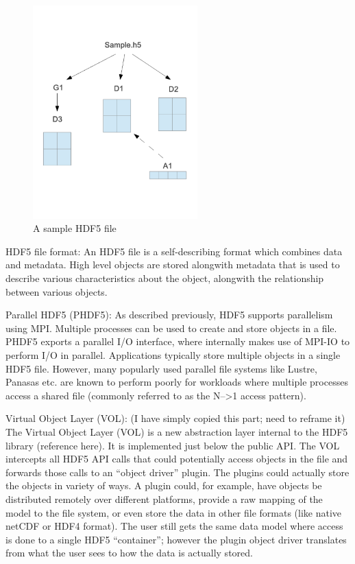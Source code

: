 \begin{figure}[!t]
\centering
\includegraphics[width=2.5in]{hdf5_example}
\caption{A sample HDF5 file}
\label{hdf5_example}
\end{figure}

HDF5 file format:
An HDF5 file is a self-describing format which combines data and metadata. High level objects are stored alongwith metadata that is used to describe various characteristics about the object, alongwith the relationship between various objects.  

Parallel HDF5 (PHDF5):
As described previously, HDF5 supports parallelism using MPI. Multiple processes can be used to create and store objects in a file. PHDF5 exports a parallel I/O interface, where internally makes use of MPI-IO to perform I/O in parallel. 
Applications typically store multiple objects in a single HDF5 file. However, many popularly used parallel file systems like Lustre, Panasas etc. are known to perform poorly for workloads where multiple processes access a shared file (commonly referred to as the N-->1 access pattern). 

Virtual Object Layer (VOL):
(I have simply copied this part; need to reframe it) The Virtual Object Layer (VOL) is a new abstraction layer internal to the HDF5 library (reference here). It is implemented just below the public API. The VOL intercepts all HDF5 API calls that could potentially access objects in the file and forwards those calls to an “object driver” plugin. The plugins could actually store the objects in variety of ways. A plugin could, for example, have objects be distributed remotely over different platforms, provide a raw mapping of the model to the file system, or even store the data in other file formats (like native netCDF or HDF4 format). The user still gets the same data model where access is done to a single HDF5 “container”; however the plugin object driver translates from what the user sees to how the data is actually stored.

